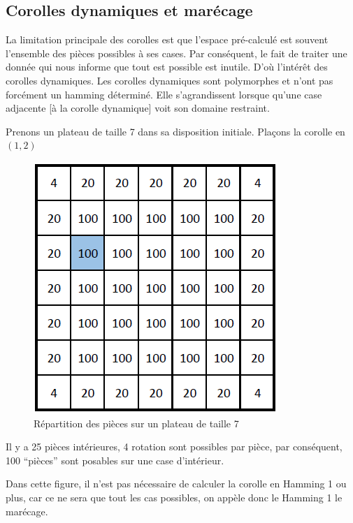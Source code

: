 	\subsection{Corolles dynamiques et marécage}
	
	La limitation principale des corolles est que l'espace pré-calculé est souvent l'ensemble des pièces possibles à ses cases. Par conséquent, le fait de traiter une donnée qui nous informe que tout est possible est inutile. D'où l'intérêt des corolles dynamiques. Les corolles dynamiques sont polymorphes et n'ont pas forcément un hamming déterminé. Elle s'agrandissent lorsque qu'une case adjacente [à la corolle dynamique] voit son domaine restraint.
	
	\begin{exmp}
		Prenons un plateau de taille 7 dans sa disposition initiale. Plaçons la corolle en $(1,2)$
		
		\begin{figure}[H]
			\centering
			\includegraphics{images/corolle_dynamique}
			\caption[Répartition des pièces sur un plateau de taille 7]{Répartition des pièces sur un plateau de taille 7}
			\label{fig:corolle_dynamique}
		\end{figure}
		
		\begin{note}
			 Il y a 25 pièces intérieures, 4 rotation sont possibles par pièce, par conséquent, 100 \enquote{pièces} sont posables sur une case d'intérieur.
		\end{note}
		
		Dans cette figure, il n'est pas nécessaire de calculer la corolle en Hamming 1 ou plus, car ce ne sera que tout les cas possibles, on appèle donc le Hamming 1 le marécage.
		

\end{exmp}
